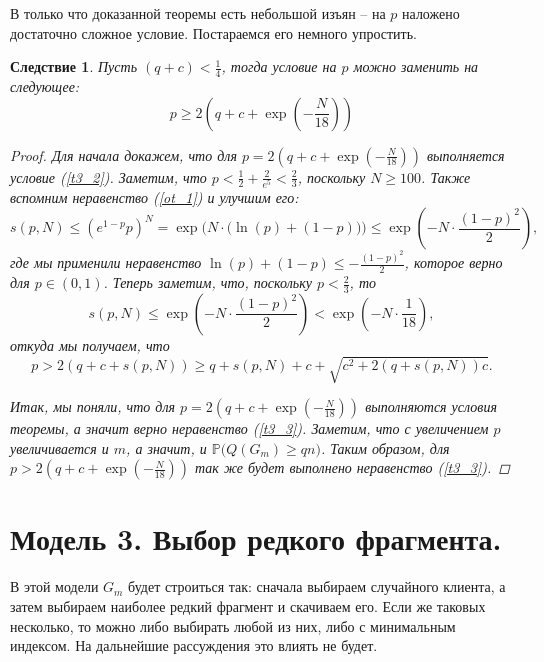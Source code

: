 \documentclass{matmex-diploma-custom}
\newcommand{\PRob}{\mathbb P}
\newcommand{\leqs}{\leqslant}
\newcommand{\geqs}{\geqslant}
\newtheorem{cons}{Следствие}
\theoremstyle{named}
\begin{document}
В только что доказанной теоремы есть небольшой изъян -- на $p$ наложено достаточно сложное условие. 
Постараемся его немного упростить.
\begin{cons}
Пусть $(q+c) < \frac{1}{4}$, тогда условие на $p$ можно заменить на следующее:
\begin{equation}
p \geqs 2\left(q + c + \exp\left(-\frac{N}{18}\right) \right)
\end{equation}

\begin{proof}
Для начала докажем, что для $p = 2\left(q + c + \exp\left(-\frac{N}{18}\right) \right)$ выполняется условие (\ref{t3_2}).
Заметим, что $p < \frac{1}{2} + \frac{2}{e^5} < \frac{2}{3}$, поскольку $N \geqs 100$.
Также вспомним неравенство (\ref{ot_1}) и улучшим его:
\begin{equation}
s(p, N) \leqs (e^{1-p} p)^N 
	=
\exp\Big(N\cdot \big( \ln(p) + (1-p) \big)\Big)
	\leqs
\exp\left( - N \cdot \frac{(1-p)^2}{2}\right),
\end{equation}
где мы применили неравенство $\ln(p) + (1-p) \leqs - \frac{(1-p)^2}{2}$, которое верно для $p\in(0,1)$.
Теперь заметим, что, поскольку $p < \frac{2}{3}$, то 
\begin{equation}
s(p, N) \leqs \exp\left( - N \cdot \frac{(1-p)^2}{2}\right) < \exp\left( - N\cdot \frac{1}{18}\right),
\end{equation}
откуда мы получаем, что 
\begin{equation}
p > 2(q+c+s(p,N)) \geqs q + s(p, N) + c + \sqrt{c^2+2(q+s(p, N))c}.
\end{equation}

Итак, мы поняли, что для $p = 2\left(q + c + \exp\left(-\frac{N}{18}\right) \right)$ выполняются условия теоремы, 
а значит верно неравенство (\ref{t3_3}). 
Заметим, что с увеличением $p$ увеличивается и $m$, а значит, и $\PRob\big(Q(G_m) \geqs qn\big)$.
Таким образом, для $p > 2\left(q + c + \exp\left(-\frac{N}{18}\right) \right)$ так же будет выполнено неравенство (\ref{t3_3}).
\end{proof}
\end{cons}


\newpage
\section*{Модель 3. Выбор редкого фрагмента.}

В этой модели $G_m$ будет строиться так: сначала выбираем случайного клиента, а затем выбираем наиболее редкий фрагмент и скачиваем его.
Если же таковых несколько, то можно либо выбирать любой из них, либо с минимальным индексом. 
На дальнейшие рассуждения это влиять не будет.
\end{document}
